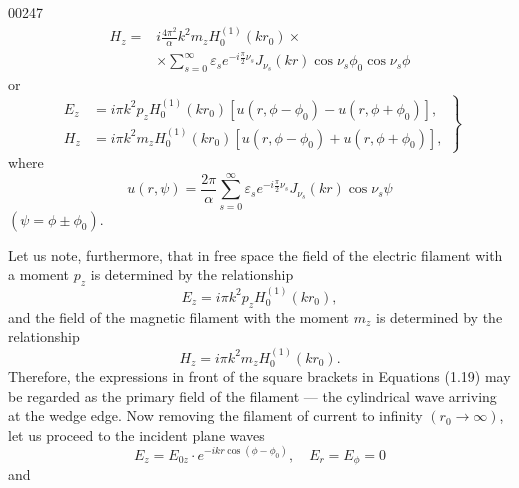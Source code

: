\begin{scanpage}{0024}{7}
\[\begin{aligned}H_z={}&i\frac{4\pi^2}{\alpha}k^2m_zH_0^{(1)}(kr_0)\times\\&\times\sum_{s=0}^{\infty}\varepsilon_se^{-i\frac\pi2\nu_s}J_{\nu_s}(kr)\cos\nu_s\phi_0\cos\nu_s\phi\end{aligned}\]
or
\[\left.\begin{aligned}E_z&=i\pi k^2p_zH_0^{(1)}(kr_0)[u(r,\phi-\phi_0)-u(r,\phi+\phi_0)],\\H_z&=i\pi k^2m_zH_0^{(1)}(kr_0)[u(r,\phi-\phi_0)+u(r,\phi+\phi_0)],\end{aligned}\right\}\tag{1.19}\]
where
\[u(r,\psi)=\frac{2\pi}{\alpha}\sum_{s=0}^{\infty}\varepsilon_se^{-i\frac\pi2\nu_s}J_{\nu_s}(kr)\cos\nu_s\psi\tag{1.20}\]
$(\psi=\phi\pm\phi_0)$.

Let us note, furthermore, that in free space the field of the electric filament with a moment $p_z$ is determined by the relationship
\[E_z=i\pi k^2p_zH_0^{(1)}(kr_0),\tag{1.21}\]
and the field of the magnetic filament with the moment $m_z$ is determined by the relationship
\[H_z=i\pi k^2m_zH_0^{(1)}(kr_0).\tag{1.22}\]
Therefore, the expressions in front of the square brackets in Equations (1.19) may be regarded as the primary field of the filament --- the cylindrical wave arriving at the wedge edge. Now removing the filament of current to infinity $(r_0\to\infty)$, let us proceed to the incident plane waves
\[E_z=E_{0z}\cdot e^{-ikr\cos(\phi-\phi_0)},\quad E_r=E_\phi=0\tag{1.23}\]
and
\end{scanpage}

